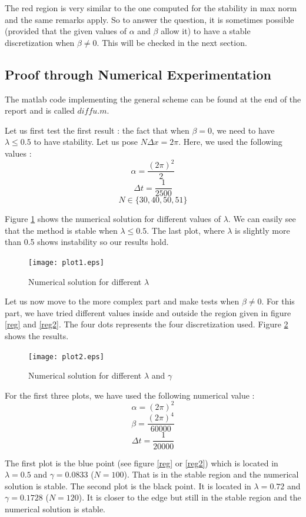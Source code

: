 The red region is very similar to the one computed for the stability in max norm and the same remarks apply. So to answer the question, it is sometimes possible (provided that the given values of $\alpha$ and $\beta$ allow it) to have a stable discretization when $\beta \neq 0$. This will be checked in the next section.

\subsection{Proof through Numerical Experimentation}
The matlab code implementing the general scheme can be found at the end of the report and is called $diffu.m$.

Let us first test the first result : the fact that when $\beta = 0$, we need to have $\lambda \leq 0.5$ to have stability. Let us pose $N\Delta x = 2\pi$. Here, we used the following values : 
$$\alpha = \frac{(2\pi)^2}{2}$$
$$\Delta t = \frac{1}{2500}$$
$$ N \in \{30,40,50,51\}$$

Figure \ref{plot1} shows the numerical solution for different values of $\lambda$. We can easily see that the method is stable when $\lambda \leq 0.5$. The last plot, where $\lambda$ is slightly more than 0.5 shows instability so our results hold.

\begin{figure}
\begin{center}
\texttt{[image: plot1.eps]}
\caption{Numerical solution for different $\lambda$}
\label{plot1}
\end{center}
\end{figure}

Let us now move to the more complex part and make tests when $\beta \neq 0$. For this part, we have tried different values inside and outside the region given in figure \ref{reg} and \ref{reg2}. The four dots represents the four discretization used. Figure \ref{plot2} shows the results.

\begin{figure}
\begin{center}
\texttt{[image: plot2.eps]}
\caption{Numerical solution for different $\lambda$ and $\gamma$}
\label{plot2}
\end{center}
\end{figure}

For the first three plots, we have used the following numerical value : 
$$\alpha = (2\pi)^2$$
$$\beta = \frac{(2\pi)^4}{60000}$$
$$\Delta t = \frac{1}{20000}$$

The first plot is the blue point (see figure \ref{reg} or \ref{reg2}) which is located in $\lambda = 0.5$ and $\gamma = 0.0833$ ($N=100$). That is in the stable region and the numerical solution is stable. The second plot is the black point. It is located in $\lambda = 0.72$ and $\gamma = 0.1728$ ($N=120$). It is closer to the edge but still in the stable region and the numerical solution is stable.

